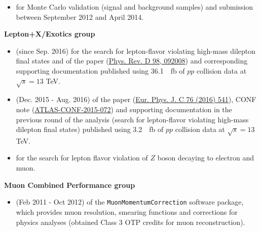 \begin{cvinterests}
{\begin{itemize}[labelwidth=0.05in,align=right,leftmargin=!,labelsep=0pt,
itemsep=0.0em]
\item[] \textsc{\color{awesome}{responsible}} for Monte Carlo validation (signal
and background samples) and submission between September 2012 and April 2014.
\end{itemize}
%
\textbf{Lepton+X/Exotics group}\\
\vspace{-2em}
\begin{itemize}[labelwidth=0.05in,align=right,leftmargin=!,labelsep=0pt,
itemsep=0.0em]
\item[] \textsc{\color{awesome}{analysis contact}} (since Sep. 2016) for
the search for lepton-flavor violating high-mass dilepton final states and 
\textsc{\color{awesome}{editor}} of the paper 
(\href{https://journals.aps.org/prd/abstract/10.1103/PhysRevD.98.092008}{Phys. Rev. D 98, 092008}) and corresponding supporting documentation published using
\SI{36.1}{\per\femto\barn} of $pp$ collision data at
$\sqrt{s}=13$ \si{\tera\electronvolt}.
\item[] \textsc{\color{awesome}{editor}} (Dec. 2015 - Aug. 2016) of the
paper (\href{https://link.springer.com/article/10.1140/epjc/s10052-016-4385-1}{Eur. Phys. J. C 76 (2016) 541}),
CONF note (\href{https://cds.cern.ch/record/2114844}{ATLAS-CONF-2015-072}) and
supporting documentation in the previous round of the analysis (search for
lepton-flavor violating high-mass dilepton final states) published using
\SI{3.2}{\per\femto\barn} of $pp$ collision data at
$\sqrt{s}=13$ \si{\tera\electronvolt}.
\item[] \textsc{\color{awesome}{editorial board member}} for the search for
lepton flavor violation of $Z$ boson decaying to electron and muon.
\end{itemize}
%
\textbf{Muon Combined Performance group}\\
\vspace{-2em}
\begin{itemize}[labelwidth=0.05in,align=right,leftmargin=!,labelsep=0pt,
itemsep=0.0em]
\item[] \textsc{\color{awesome}{developer and maintainer}} (Feb 2011 - Oct 2012)
of the \texttt{MuonMomentumCorrection} software package, which provides muon
resolution, smearing functions and corrections for physics analyses (obtained
Class 3 OTP credits for muon reconstruction).
\end{itemize}
%
}

\end{cvinterests}
